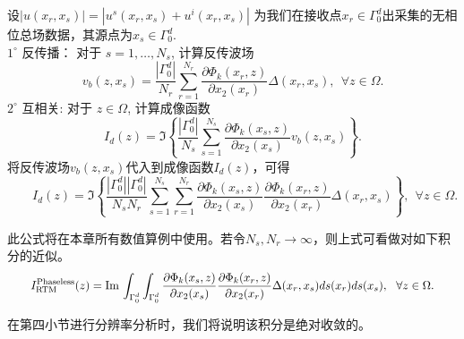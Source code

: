 \begin{algorithm}[半空间无相位逆时偏移算法]\label{alg_phaseless}
设$|u(x_r,x_s)|=|u^s(x_r,x_s)+u^i(x_r,x_s)|$ 为我们在接收点$x_r\in\Gamma_0^d$出采集的无相位总场数据，其源点为$x_s\in\Gamma_0^d$.\\
$1^\circ$ 反传播： 对于 $s=1,\ldots,N_s$, 计算反传波场
\begin{equation}
  v_b(z,x_s)=\frac{|\Gamma_0^d|}{N_r}\sum\limits_{r=1}^{N_r}\frac{\partial\Phi_k(x_r,z)}{\partial x_2(x_r)}\Delta(x_r,x_s),\  \  \forall z\in\Omega.
\end{equation}
$2^\circ$ 互相关: 对于 $z\in\Omega$, 计算成像函数
\begin{equation}
  I_d(z)=\Im\left\{\frac{|\Gamma_0^d|}{N_s}\sum\limits_{s=1}^{N_s}\frac{\partial\Phi_k(x_s,z)}{\partial x_2(x_s)}v_b(z,x_s)
  \right\}.
\end{equation}
将反传波场$v_b(z,x_s)$代入到成像函数$I_d(z)$，可得
\begin{equation}
  \qquad I_d(z)=\Im\left\{\frac{|\Gamma_0^d||\Gamma_0^d|}{N_sN_r}
  \sum\limits_{s=1}^{N_s}\sum\limits_{r=1}^{N_r}
  \frac{\partial\Phi_k(x_s,z)}{\partial x_2(x_s)}\frac{\partial\Phi_k(x_r,z)}{\partial x_2(x_r)}
  \Delta(x_r,x_s)
  \right\},\  \ \forall z\in\Omega.\quad\quad
\end{equation}
\end{algorithm}
此公式将在本章所有数值算例中使用。若令$N_s,N_r\rightarrow\infty$，则上式可看做对如下积分的近似。
\begin{equation*}
 \qquad  I^{\rm Phaseless}_{\rm RTM}(z)=\Im\int_{\Gamma_0^d}\int_{\Gamma_0^d}\frac{\partial\Phi_k(x_s,z)}{\partial x_2(x_s)}\frac{\partial\Phi_k(x_r,z)}{\partial x_2(x_r)}
  \Delta(x_r,x_s)ds(x_r)ds(x_s),\  \  \forall z\in\Omega.\quad\quad
\end{equation*}

在第四小节进行分辨率分析时，我们将说明该积分是绝对收敛的。
